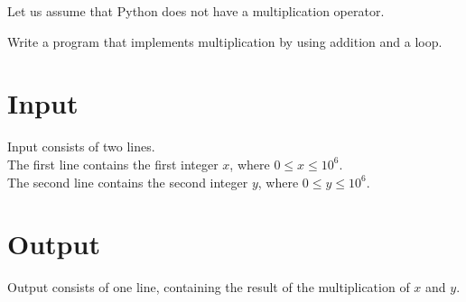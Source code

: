 
Let us assume that Python does not have a multiplication operator.

Write a program that implements multiplication by using addition and a loop.

\section*{Input}
Input consists of two lines. \\
The first line contains the first integer $x$, where $0 \leq x \leq 10^6$. \\
The second line contains the second integer $y$, where $0 \leq y \leq 10^6$. \\

\section*{Output}
Output consists of one line, containing the result of the multiplication of $x$ and $y$.
